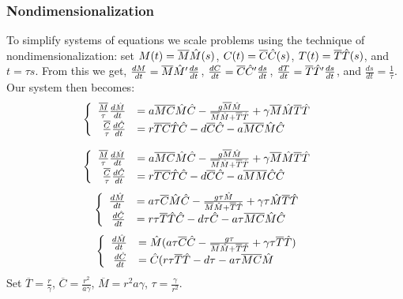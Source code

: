 \begin{frame}
  \frametitle{Nondimensionalization}
  To simplify systems of equations we scale problems using the technique of nondimensionalization: set $M(t)=\overline{M}\HAT{M}(s)$, $C(t)=\overline{C}\HAT{C}(s)$, $T(t)=\overline{T}\HAT{T}(s)$, and $t=\tau s$. From this we get, $\frac{dM}{dt}=\overline{M}\HAT{M}'\frac{ds}{dt}$, $\frac{dC}{dt}=\overline{C}\HAT{C}'\frac{ds}{dt}$, $\frac{dT}{dt}=\overline{T}\HAT{T}'\frac{ds}{dt}$, and $\frac{ds}{dt}=\frac{1}{\tau}$. Our system then becomes: $$\begin{cases} 
\begin{array}{rl}
\frac{\overline{M}}{\tau}\frac{d\HAT{M}}{dt}&= a\overline{M}\overline{C}\HAT{M}\HAT{C}-\frac{g\overline{M}\HAT{M}}{\overline{M}\HAT{M}+\overline{T}\HAT{T}} + \gamma \overline{M}\HAT{M}\overline{T}\HAT{T}\\ 
\frac{\overline{C}}{\tau}\frac{d\HAT{C}}{dt}&=r\overline{T}\overline{C}\HAT{T}\HAT{C}-d\overline{C}\HAT{C}-a\overline{M}\overline{C}\HAT{M}\HAT{C}
\end{array} \end{cases}$$
\end{frame}
{\center
\begin{frame}$$\begin{cases}
\begin{array}{rl}
\frac{\overline{M}}{\tau}\frac{d\HAT{M}}{dt}&= a\overline{M}\overline{C}\HAT{M}\HAT{C}-\frac{g\overline{M}\HAT{M}}{\overline{M}\HAT{M}+\overline{T}\HAT{T}} + \gamma \overline{M}\HAT{M}\overline{T}\HAT{T}\\ 
\frac{\overline{C}}{\tau}\frac{d\HAT{C}}{dt}&=r\overline{T}\overline{C}\HAT{T}\HAT{C}-d\overline{C}\HAT{C}-a\overline{M}\overline{M}\HAT{C}\HAT{C}
\end{array} \end{cases}$$$$\begin{cases}
\begin{array}{rl}
\frac{d\HAT{M}}{dt}&= a\tau\overline{C}\HAT{M}\HAT{C}-\frac{g\tau\HAT{M}}{\overline{M}\HAT{M}+\overline{T}\HAT{T}} + \gamma \tau\HAT{M}\overline{T}\HAT{T}\\ 
\frac{d\HAT{C}}{dt}&=r\tau\overline{T}\HAT{T}\HAT{C}-d\tau\HAT{C}-a\tau\overline{M}\overline{C}\HAT{M}\HAT{C}
\end{array} \end{cases}$$$$\begin{cases}
\begin{array}{rl}
\frac{d\HAT{M}}{dt}&= \HAT{M}(a\tau\overline{C}\HAT{C}-\frac{g\tau}{\overline{M}\HAT{M}+\overline{T}\HAT{T}} + \gamma \tau\overline{T}\HAT{T})\\ 
\frac{d\HAT{C}}{dt}&=\HAT{C}(r\tau\overline{T}\HAT{T}-d\tau-a\tau\overline{M}\overline{C}\HAT{M}
\end{array} \end{cases}$$ Set $\overline{T}=\frac{r}{\gamma}$, $\overline{C}=\frac{r^2}{a\gamma}$, $\overline{M}={r^2}{a\gamma}$, $\tau=\frac{\gamma}{r^2}$.
\end{frame}
}
